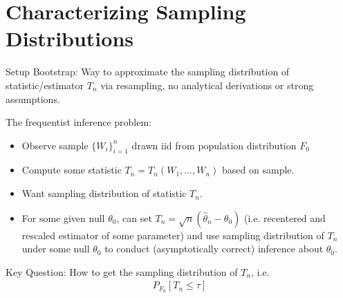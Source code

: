 \documentclass[aspectratio=169, handout]{beamer}
\begin{document}
\section{Characterizing Sampling Distributions}

{\footnotesize
\begin{frame}{Setup}
\alert{Bootstrap}: Way to \alert{approximate} the \alert{sampling}
distribution of statistic/estimator $T_n$ via resampling, no analytical
derivations or strong assumptions.

The frequentist inference problem:
\begin{itemize}
  \item Observe \alert{sample} $\{W_i\}_{i=1}^n$
    drawn iid from \alert{population} distribution $F_0$
  \item Compute some \alert{statistic} $T_n=T_n(W_1,\ldots,W_n)$ based
    on sample.
  \item Want \alert{sampling distribution} of statistic $T_n$.
  \item
    For some given null $\theta_0$, can set
    $T_n={\sqrt{n}}(\hat{\theta}_n-\theta_0)$ (i.e. recentered and
    rescaled estimator of some parameter) and use sampling
    distribution of $T_n$ under some null $\theta_0$ to conduct
    (asymptotically correct) inference about $\theta_0$.
\end{itemize}
\alert{Key Question}:
How to get the sampling distribution of $T_n$, i.e.
\begin{align*}
  P_{F_0}[T_n \leq \tau]
\end{align*}
\end{frame}
}
\end{document}
